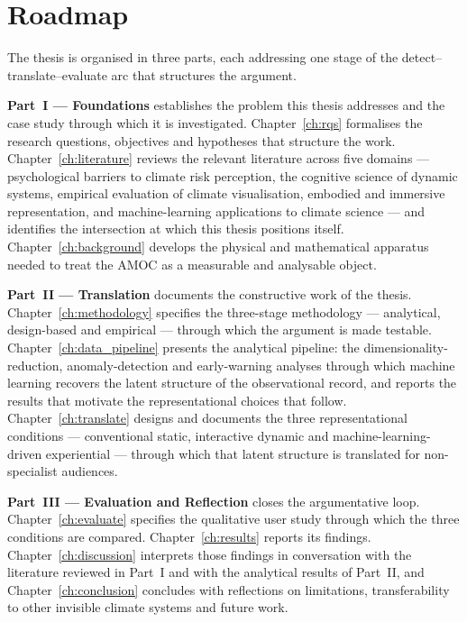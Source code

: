 \section{Roadmap}
\label{sec:roadmap}

The thesis is organised in three parts, each addressing one stage of the detect–translate–evaluate arc that structures the argument.

\textbf{Part~I --- Foundations} establishes the problem this thesis addresses and the case study through which it is investigated. Chapter~\ref{ch:rqs} formalises the research questions, objectives and hypotheses that structure the work. Chapter~\ref{ch:literature} reviews the relevant literature across five domains --- psychological barriers to climate risk perception, the cognitive science of dynamic systems, empirical evaluation of climate visualisation, embodied and immersive representation, and machine-learning applications to climate science --- and identifies the intersection at which this thesis positions itself. Chapter~\ref{ch:background} develops the physical and mathematical apparatus needed to treat the AMOC as a measurable and analysable object.

\textbf{Part~II --- Translation} documents the constructive work of the thesis. Chapter~\ref{ch:methodology} specifies the three-stage methodology --- analytical, design-based and empirical --- through which the argument is made testable. Chapter~\ref{ch:data_pipeline} presents the analytical pipeline: the dimensionality-reduction, anomaly-detection and early-warning analyses through which machine learning recovers the latent structure of the observational record, and reports the results that motivate the representational choices that follow. Chapter~\ref{ch:translate} designs and documents the three representational conditions --- conventional static, interactive dynamic and machine-learning-driven experiential --- through which that latent structure is translated for non-specialist audiences.

\textbf{Part~III --- Evaluation and Reflection} closes the argumentative loop. Chapter~\ref{ch:evaluate} specifies the qualitative user study through which the three conditions are compared. Chapter~\ref{ch:results} reports its findings. Chapter~\ref{ch:discussion} interprets those findings in conversation with the literature reviewed in Part~I and with the analytical results of Part~II, and Chapter~\ref{ch:conclusion} concludes with reflections on limitations, transferability to other invisible climate systems and future work.
